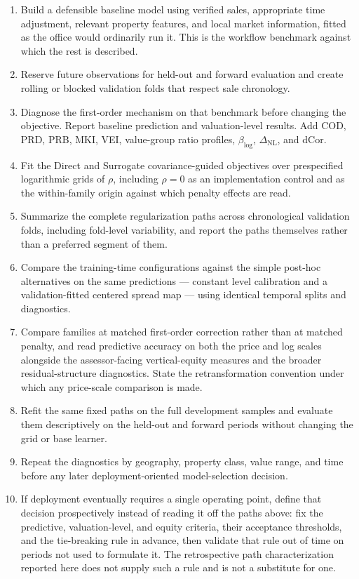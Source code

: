 \documentclass[10pt]{article}
\theoremstyle{definition}
\newcommand{\1}{\mathbf{1}}
\begin{document}
\begin{enumerate}[leftmargin=7mm]
    \item Build a defensible baseline model using verified sales, appropriate time adjustment, relevant property features, and local market information, fitted as the office would ordinarily run it. This is the workflow benchmark against which the rest is described.
    \item Reserve future observations for held-out and forward evaluation and create rolling or blocked validation folds that respect sale chronology.
    \item Diagnose the first-order mechanism on that benchmark before changing the objective. Report baseline prediction and valuation-level results. Add COD, PRD, PRB, MKI, VEI, value-group ratio profiles, $\beta_{\log}$, $\Delta_{\mathrm{NL}}$, and dCor.
    \item Fit the Direct and Surrogate covariance-guided objectives over prespecified logarithmic grids of $\rho$, including $\rho=0$ as an implementation control and as the within-family origin against which penalty effects are read.
    \item Summarize the complete regularization paths across chronological validation folds, including fold-level variability, and report the paths themselves rather than a preferred segment of them.
    \item Compare the training-time configurations against the simple post-hoc alternatives on the same predictions --- constant level calibration and a validation-fitted centered spread map --- using identical temporal splits and diagnostics.
    \item Compare families at matched first-order correction rather than at matched penalty, and read predictive accuracy on both the price and log scales alongside the assessor-facing vertical-equity measures and the broader residual-structure diagnostics. State the retransformation convention under which any price-scale comparison is made.
    \item Refit the same fixed paths on the full development samples and evaluate them descriptively on the held-out and forward periods without changing the grid or base learner.
    \item Repeat the diagnostics by geography, property class, value range, and time before any later deployment-oriented model-selection decision.
    \item If deployment eventually requires a single operating point, define that decision prospectively instead of reading it off the paths above: fix the predictive, valuation-level, and equity criteria, their acceptance thresholds, and the tie-breaking rule in advance, then validate that rule out of time on periods not used to formulate it. The retrospective path characterization reported here does not supply such a rule and is not a substitute for one.
\end{enumerate}
\end{document}
